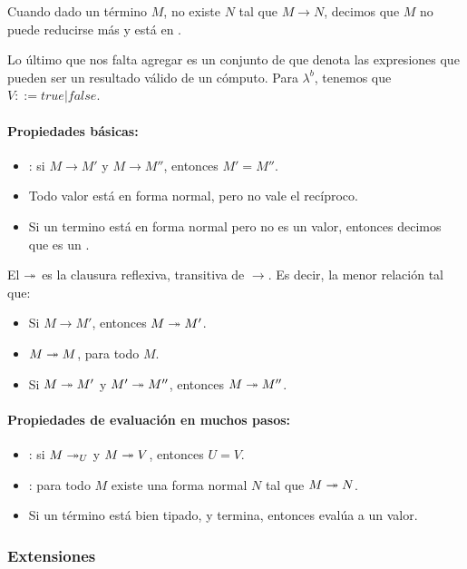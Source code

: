 Cuando dado un término $M$, no existe $N$ tal que $M\to N$, decimos que $M$ no puede reducirse más y está en .

Lo último que nos falta agregar es un conjunto de  que denota las expresiones que pueden ser un resultado válido de un cómputo. Para $\lambda^b$, tenemos que $V ::= true \vert false$.

\paragraph{Propiedades básicas:}

\begin{itemize}
  \item {}: si $M \to M'$ y $M \to M''$, entonces $M'= M''$.
  \item Todo valor está en forma normal, pero no vale el recíproco.
  \item Si un termino está en forma normal pero no es un valor, entonces decimos que es un .
\end{itemize}

\noindent
El  $\twoheadrightarrow$ es la clausura reflexiva, transitiva de $\to$. Es decir, la menor relación tal que:

\begin{itemize}
  \item Si $M\to M'$, entonces $M\twoheadrightarrow M'$.
  \item $M\twoheadrightarrow M$, para todo $M$.
  \item Si $M \twoheadrightarrow M'$ y $M' \twoheadrightarrow M''$, entonces $M \twoheadrightarrow M''$.
\end{itemize}

\paragraph{Propiedades de evaluación en muchos pasos:}

\begin{itemize}
  \item {}: si $M \twoheadrightarrow _U$ y $M \twoheadrightarrow V$, entonces $U=V$.
  \item {}: para todo $M$ existe una forma normal $N$ tal que $M \twoheadrightarrow N$.
  \item Si un término está bien tipado, y termina, entonces evalúa a un valor.
\end{itemize}

\subsubsection{Extensiones}

